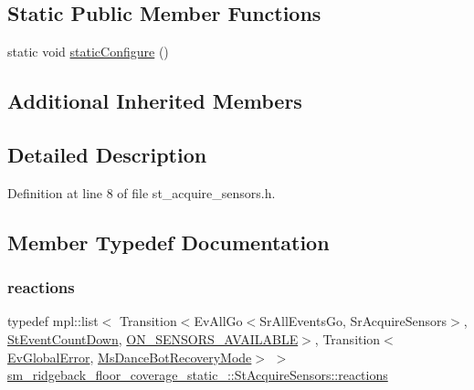 \subsection*{Static Public Member Functions}
\begin{DoxyCompactItemize}
\item 
static void \hyperlink{structsm__ridgeback__floor__coverage__static__1_1_1StAcquireSensors_a2e318d3806ffa9774a0266a54d5c6266}{static\+Configure} ()
\end{DoxyCompactItemize}
\subsection*{Additional Inherited Members}


\subsection{Detailed Description}


Definition at line 8 of file st\+\_\+acquire\+\_\+sensors.\+h.



\subsection{Member Typedef Documentation}
\mbox{\label{structsm__ridgeback__floor__coverage__static__1_1_1StAcquireSensors_a0a9c15010f74294f943d5c7e427525d3}} 
\subsubsection{\texorpdfstring{reactions}{reactions}}
{\footnotesize\ttfamily typedef mpl\+::list$<$ Transition$<$Ev\+All\+Go$<$Sr\+All\+Events\+Go, Sr\+Acquire\+Sensors$>$, \hyperlink{structsm__ridgeback__floor__coverage__static__1_1_1StEventCountDown}{St\+Event\+Count\+Down}, \hyperlink{structsm__ridgeback__floor__coverage__static__1_1_1StAcquireSensors_1_1ON__SENSORS__AVAILABLE}{O\+N\+\_\+\+S\+E\+N\+S\+O\+R\+S\+\_\+\+A\+V\+A\+I\+L\+A\+B\+LE}$>$, Transition$<$\hyperlink{structsm__ridgeback__floor__coverage__static__1_1_1EvGlobalError}{Ev\+Global\+Error}, \hyperlink{classsm__ridgeback__floor__coverage__static__1_1_1MsDanceBotRecoveryMode}{Ms\+Dance\+Bot\+Recovery\+Mode}$>$ $>$ \hyperlink{structsm__ridgeback__floor__coverage__static__1_1_1StAcquireSensors_a0a9c15010f74294f943d5c7e427525d3}{sm\+\_\+ridgeback\+\_\+floor\+\_\+coverage\+\_\+static\+\_\+::\+St\+Acquire\+Sensors\+::reactions}}




